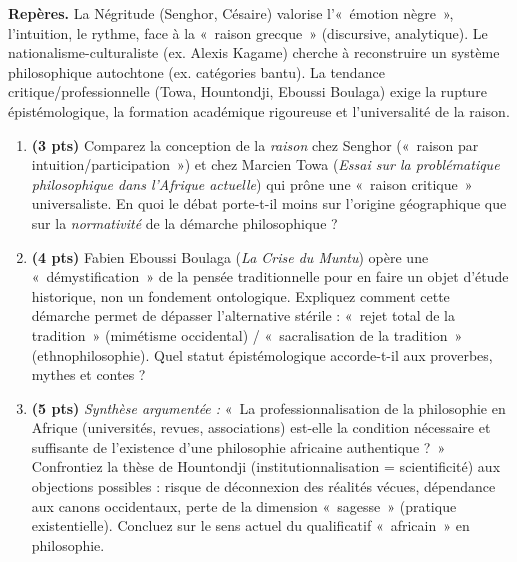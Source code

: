 \documentclass[11pt]{article}
\begin{document}
\begin{exercice}
\textbf{Repères.} La Négritude (Senghor, Césaire) valorise l'«~émotion nègre~», l'intuition, le rythme, face à la «~raison grecque~» (discursive, analytique). Le nationalisme-culturaliste (ex. Alexis Kagame) cherche à reconstruire un système philosophique autochtone (ex. catégories bantu). La tendance critique/professionnelle (Towa, Hountondji, Eboussi Boulaga) exige la rupture épistémologique, la formation académique rigoureuse et l'universalité de la raison.

\begin{enumerate}
    \item \textbf{(3 pts)} Comparez la conception de la \textit{raison} chez Senghor («~raison par intuition/participation~») et chez Marcien Towa (\textit{Essai sur la problématique philosophique dans l'Afrique actuelle}) qui prône une «~raison critique~» universaliste. En quoi le débat porte-t-il moins sur l'origine géographique que sur la \textit{normativité} de la démarche philosophique ?
    \item \textbf{(4 pts)} Fabien Eboussi Boulaga (\textit{La Crise du Muntu}) opère une «~démystification~» de la pensée traditionnelle pour en faire un objet d'étude historique, non un fondement ontologique. Expliquez comment cette démarche permet de dépasser l'alternative stérile : «~rejet total de la tradition~» (mimétisme occidental) / «~sacralisation de la tradition~» (ethnophilosophie). Quel statut épistémologique accorde-t-il aux proverbes, mythes et contes ?
    \item \textbf{(5 pts)} \textit{Synthèse argumentée :} «~La professionnalisation de la philosophie en Afrique (universités, revues, associations) est-elle la condition nécessaire et suffisante de l'existence d'une philosophie africaine authentique ?~» Confrontiez la thèse de Hountondji (institutionnalisation = scientificité) aux objections possibles : risque de déconnexion des réalités vécues, dépendance aux canons occidentaux, perte de la dimension «~sagesse~» (pratique existentielle). Concluez sur le sens actuel du qualificatif «~africain~» en philosophie.
\end{enumerate}
\end{exercice}
\end{document}
